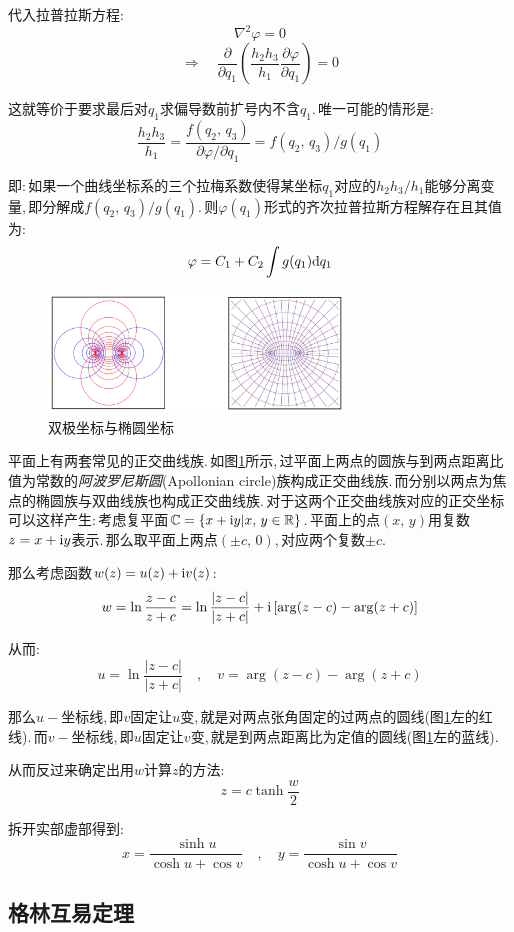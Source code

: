 代入拉普拉斯方程:
\[\nabla^2 \varphi=0\]
\[\Rightarrow \quad \frac{\partial}{\partial q_1}\left(\frac{h_2h_3}{h_1}\frac{\partial \varphi}{\partial q_1}\right)=0\]

这就等价于要求最后对$q_1$求偏导数前扩号内不含$q_1$.\,唯一可能的情形是:
\[\frac{h_2h_3}{h_1}=\frac{f(q_2,\,q_3)}{\partial \varphi/\partial q_1}=f(q_2,\,q_3)/g(q_1)\]

即:\,如果一个曲线坐标系的三个拉梅系数使得某坐标$q_1$对应的$h_2h_3/h_1$能够分离变量,\,即分解成$f(q_2,\,q_3)/g(q_1)$.\,则$\varphi(q_1)$形式的齐次拉普拉斯方程解存在且其值为:
\[\varphi=C_1+C_2\int g(q_1)\textrm{d} q_1\]

\begin{figure}[H]
\centering
\includegraphics[width=0.7\textwidth]{image/7-2-19.png}
\caption{双极坐标与椭圆坐标}\label{fig:7-2-19}
\end{figure}

平面上有两套常见的正交曲线族.\,如图\ref{fig:7-2-19}所示,\,过平面上两点的圆族与到两点距离比值为常数的\emph{阿波罗尼斯圆}(Apollonian circle)族构成正交曲线族.\,而分别以两点为焦点的椭圆族与双曲线族也构成正交曲线族.\,对于这两个正交曲线族对应的正交坐标可以这样产生:\,考虑复平面$\mathbb{C}=\{x+{\rm i} y|x,\,y\in \mathbb{R}\}$.\,平面上的点$(x,\,y)$用复数$z=x+{\rm i} y$表示.\,那么取平面上两点$(\pm c,\,0)$,\,对应两个复数$\pm c$.

那么考虑函数$w(z)=u(z)+{\rm i} v(z)$:
\[w=\ln\frac{z-c}{z+c}=\ln\frac{|z-c|}{|z+c|}+{\rm i}\left[\arg(z-c)-\arg(z+c)\right]\]

从而:
\[u=\ln\frac{|z-c|}{|z+c|}\quad ,\quad v=\arg(z-c)-\arg(z+c)\]

那么$u-$坐标线,\,即$v$固定让$u$变,\,就是对两点张角固定的过两点的圆线(图\ref{fig:7-2-19}左的红线).\,而$v-$坐标线,\,即$u$固定让$v$变,\,就是到两点距离比为定值的圆线(图\ref{fig:7-2-19}左的蓝线).

从而反过来确定出用$w$计算$z$的方法:
\[z=c\tanh \frac{w}{2}\]

拆开实部虚部得到:
\[x=\frac{\sinh u}{\cosh u+\cos v}\quad ,\quad y=\frac{\sin v}{\cosh u+\cos v}\]




\subsection{格林互易定理}



